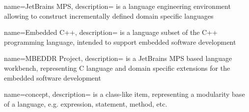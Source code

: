 

{
  name=JetBrains MPS,
  description={ is a language engineering environment 
  allowing to construct incrementally defined domain specific languages}
}

{
  name=Embedded C++,
  description={ is a language subset of the C++ programming language, intended to
  support embedded software development}
}

{
  name=MBEDDR Project,
  description={ is a JetBrains MPS based language workbench, representing C language and domain specific
  extensions for the embedded software development}
}


{
  name=concept,
  description={ is a class-like item, representing a modularity base of a language, e.g. expression, statement,
  method, etc.}
}

